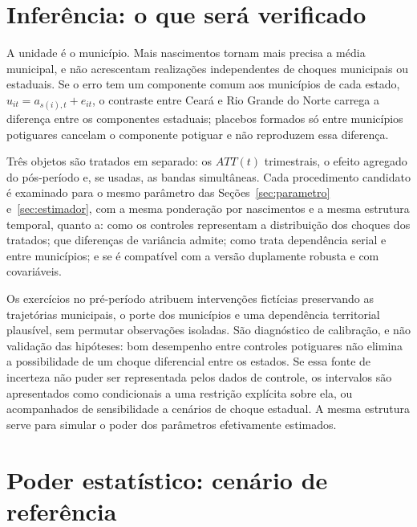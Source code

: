 \section{Inferência: o que será verificado}

A unidade é o município. Mais nascimentos tornam mais precisa a média
municipal, e não acrescentam realizações independentes de choques municipais ou
estaduais. Se o erro tem um componente comum aos municípios de cada estado,
$u_{it} = a_{s(i),t} + e_{it}$, o contraste entre Ceará e Rio Grande do Norte
carrega a diferença entre os componentes estaduais; placebos formados só entre
municípios potiguares cancelam o componente potiguar e não reproduzem essa
diferença.

Três objetos são tratados em separado: os $ATT(t)$ trimestrais, o efeito
agregado do pós-período e, se usadas, as bandas simultâneas. Cada procedimento
candidato é examinado para o mesmo parâmetro das Seções~\ref{sec:parametro}
e~\ref{sec:estimador}, com a
mesma ponderação por nascimentos e a mesma estrutura temporal, quanto a: como os
controles representam a distribuição dos choques dos tratados; que diferenças
de variância admite; como trata dependência serial e entre municípios; e se é
compatível com a versão duplamente robusta e com covariáveis.

Os exercícios no pré-período atribuem intervenções fictícias preservando as
trajetórias municipais, o porte dos municípios e uma dependência territorial
plausível, sem permutar observações isoladas. São diagnóstico de calibração, e
não validação das hipóteses: bom desempenho entre controles potiguares não
elimina a possibilidade de um choque diferencial entre os estados. Se essa
fonte de incerteza não puder ser representada pelos dados de controle, os
intervalos são apresentados como condicionais a uma restrição explícita sobre
ela, ou acompanhados de sensibilidade a cenários de choque estadual. A mesma
estrutura serve para simular o poder dos parâmetros efetivamente estimados.

\section{Poder estatístico: cenário de referência}
\label{sec:poder}

